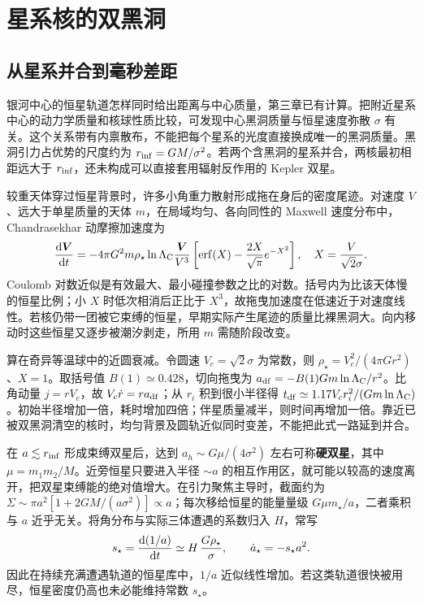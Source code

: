 \section{星系核的双黑洞}\label{sec:gw-csmbh}

\subsection{从星系并合到毫秒差距}

银河中心的恒星轨道怎样同时给出距离与中心质量，第三章已有计算。把附近星系中心的动力学质量和核球性质比较，可发现中心黑洞质量与恒星速度弥散 $\sigma$ 有关。这个关系带有内禀散布，不能把每个星系的光度直接换成唯一的黑洞质量。黑洞引力占优势的尺度约为 $r_{\rm inf}=GM/\sigma^2$。若两个含黑洞的星系并合，两核最初相距远大于 $r_{\rm inf}$，还未构成可以直接套用辐射反作用的 Kepler 双星。

较重天体穿过恒星背景时，许多小角重力散射形成拖在身后的密度尾迹。对速度 $V$、远大于单星质量的天体 $m$，在局域均匀、各向同性的 Maxwell 速度分布中，Chandrasekhar 动摩擦加速度为
\[
 \frac{\dd\bm V}{\dd t}=-4\pi G^2m\rho_\star\ln\Lambda_{\rm C}
 \frac{\bm V}{V^3}\left[\operatorname{erf}(X)
                  -\frac{2X}{\sqrt\pi}e^{-X^2}\right],
 \quad X=\frac{V}{\sqrt2\sigma}.
\]
Coulomb 对数近似是有效最大、最小碰撞参数之比的对数。括号内为比该天体慢的恒星比例；小 $X$ 时低次相消后正比于 $X^3$，故拖曳加速度在低速近于对速度线性。若核仍带一团被它束缚的恒星，早期实际产生尾迹的质量比裸黑洞大。向内移动时这些恒星又逐步被潮汐剥走，所用 $m$ 需随阶段改变。

算在奇异等温球中的近圆衰减。令圆速 $V_c=\sqrt2\sigma$ 为常数，则 $\rho_\star=V_c^2/(4\pi G r^2)$、$X=1$。取括号值 $B(1)\simeq0.428$，切向拖曳为 $a_{\rm df}=-B(1)Gm\ln\Lambda_{\rm C}/r^2$。比角动量 $j=rV_c$，故 $V_c\dot r=r a_{\rm df}$；从 $r_i$ 积到很小半径得 $t_{\rm df}\simeq1.17 V_c r_i^2/(Gm\ln\Lambda_{\rm C})$。初始半径增加一倍，耗时增加四倍；伴星质量减半，则时间再增加一倍。靠近已被双黑洞清空的核时，均匀背景及圆轨近似同时变差，不能把此式一路延到并合。

在 $a\lesssim r_{\rm inf}$ 形成束缚双星后，达到 $a_h\sim G\mu/(4\sigma^2)$ 左右可称\textbf{硬双星}，其中 $\mu=m_1m_2/M$。近旁恒星只要进入半径 $\sim a$ 的相互作用区，就可能以较高的速度离开，把双星束缚能的绝对值增大。在引力聚焦主导时，截面约为 $\Sigma\sim \pi a^2[1+2GM/(a\sigma^2)]\propto a$；每次移给恒星的能量量级 $G\mu m_\star/a$，二者乘积与 $a$ 近乎无关。将角分布与实际三体遭遇的系数归入 $H$，常写
\[
 s_\star=\frac{\dd(1/a)}{\dd t}\simeq H\,\frac{G\rho_\star}{\sigma},
 \qquad \dot a_\star=-s_\star a^2 .
\]
因此在持续充满遭遇轨道的恒星库中，$1/a$ 近似线性增加。若这类轨道很快被用尽，恒星密度仍高也未必能维持常数 $s_\star$。

